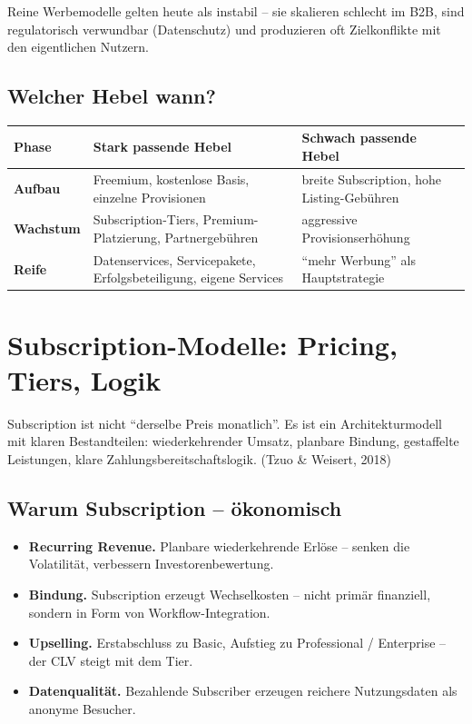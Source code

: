 \documentclass[11pt,a4paper,oneside]{article}
\newcommand{\fachbegriff}[1]{\textbf{#1}}
\newcommand{\quelle}[1]{{\footnotesize\color{lpGray}(#1)}}
\begin{document}
Reine Werbemodelle gelten heute als instabil -- sie skalieren schlecht im B2B, sind regulatorisch verwundbar (Datenschutz) und produzieren oft Zielkonflikte mit den eigentlichen Nutzern.

\subsection{Welcher Hebel wann?}

\begin{tabularx}{\linewidth}{@{}>{\bfseries}lXX@{}}
\toprule
Phase & Stark passende Hebel & Schwach passende Hebel \\
\midrule
Aufbau & Freemium, kostenlose Basis, einzelne Provisionen & breite Subscription, hohe Listing-Gebühren \\
Wachstum & Subscription-Tiers, Premium-Platzierung, Partnergebühren & aggressive Provisionserhöhung \\
Reife & Datenservices, Servicepakete, Erfolgsbeteiligung, eigene Services & ``mehr Werbung'' als Hauptstrategie \\
\bottomrule
\end{tabularx}

\section{Subscription-Modelle: Pricing, Tiers, Logik}

Subscription ist nicht ``derselbe Preis monatlich''. Es ist ein Architekturmodell mit klaren Bestandteilen: wiederkehrender Umsatz, planbare Bindung, gestaffelte Leistungen, klare Zahlungsbereitschaftslogik. \quelle{Tzuo \& Weisert, 2018}

\subsection{Warum Subscription -- ökonomisch}

\begin{itemize}
  \item \fachbegriff{Recurring Revenue.} Planbare wiederkehrende Erlöse -- senken die Volatilität, verbessern Investorenbewertung.
  \item \fachbegriff{Bindung.} Subscription erzeugt Wechselkosten -- nicht primär finanziell, sondern in Form von Workflow-Integration.
  \item \fachbegriff{Upselling.} Erstabschluss zu Basic, Aufstieg zu Professional / Enterprise -- der CLV steigt mit dem Tier.
  \item \fachbegriff{Datenqualität.} Bezahlende Subscriber erzeugen reichere Nutzungsdaten als anonyme Besucher.
\end{itemize}
\end{document}

